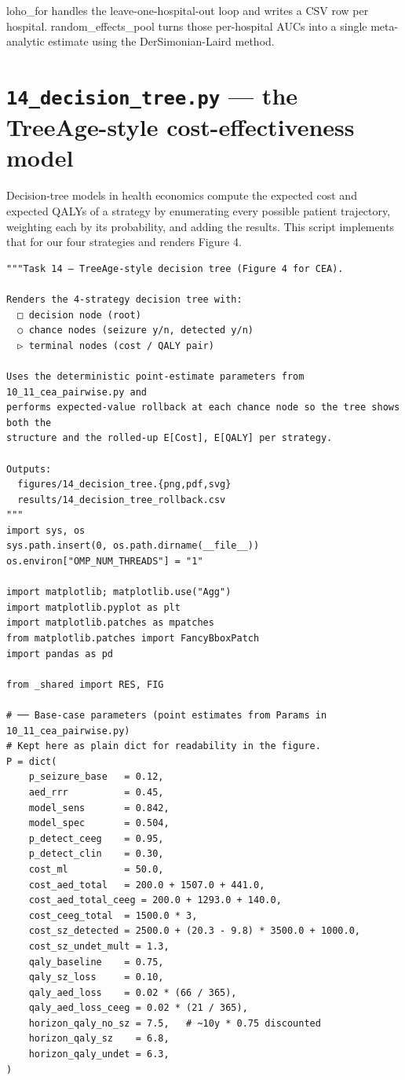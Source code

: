 \documentclass[11pt,a4paper]{article}
\begin{document}
loho\_for handles the leave-one-hospital-out loop and writes a CSV row per hospital. random\_effects\_pool turns those per-hospital AUCs into a single meta-analytic estimate using the DerSimonian-Laird method.
\clearpage
\section{\texttt{14\_decision\_tree.py} — the TreeAge-style cost-effectiveness model}
Decision-tree models in health economics compute the expected cost and expected QALYs of a strategy by enumerating every possible patient trajectory, weighting each by its probability, and adding the results. This script implements that for our four strategies and renders Figure 4.

\begin{lstlisting}[style=codeblock]
"""Task 14 — TreeAge-style decision tree (Figure 4 for CEA).

Renders the 4-strategy decision tree with:
  □ decision node (root)
  ○ chance nodes (seizure y/n, detected y/n)
  ▷ terminal nodes (cost / QALY pair)

Uses the deterministic point-estimate parameters from 10_11_cea_pairwise.py and
performs expected-value rollback at each chance node so the tree shows both the
structure and the rolled-up E[Cost], E[QALY] per strategy.

Outputs:
  figures/14_decision_tree.{png,pdf,svg}
  results/14_decision_tree_rollback.csv
"""
import sys, os
sys.path.insert(0, os.path.dirname(__file__))
os.environ["OMP_NUM_THREADS"] = "1"

import matplotlib; matplotlib.use("Agg")
import matplotlib.pyplot as plt
import matplotlib.patches as mpatches
from matplotlib.patches import FancyBboxPatch
import pandas as pd

from _shared import RES, FIG

# ── Base-case parameters (point estimates from Params in 10_11_cea_pairwise.py)
# Kept here as plain dict for readability in the figure.
P = dict(
    p_seizure_base   = 0.12,
    aed_rrr          = 0.45,
    model_sens       = 0.842,
    model_spec       = 0.504,
    p_detect_ceeg    = 0.95,
    p_detect_clin    = 0.30,
    cost_ml          = 50.0,
    cost_aed_total   = 200.0 + 1507.0 + 441.0,
    cost_aed_total_ceeg = 200.0 + 1293.0 + 140.0,
    cost_ceeg_total  = 1500.0 * 3,
    cost_sz_detected = 2500.0 + (20.3 - 9.8) * 3500.0 + 1000.0,
    cost_sz_undet_mult = 1.3,
    qaly_baseline    = 0.75,
    qaly_sz_loss     = 0.10,
    qaly_aed_loss    = 0.02 * (66 / 365),
    qaly_aed_loss_ceeg = 0.02 * (21 / 365),
    horizon_qaly_no_sz = 7.5,   # ~10y * 0.75 discounted
    horizon_qaly_sz    = 6.8,
    horizon_qaly_undet = 6.3,
)


\end{lstlisting}
\end{document}
